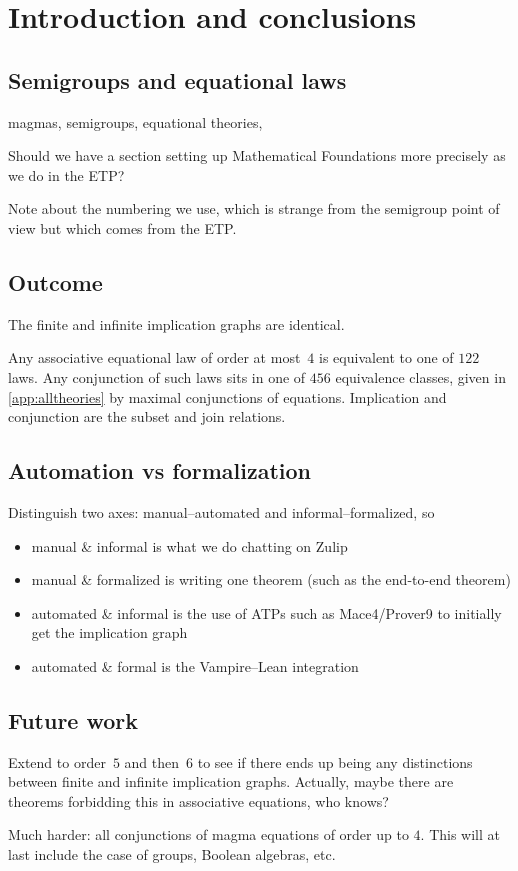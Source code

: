 \section{Introduction and conclusions}

\subsection{Semigroups and equational laws}


magmas, semigroups, equational theories,

Should we have a section setting up Mathematical Foundations more precisely as we do in the ETP?

Note about the numbering we use, which is strange from the semigroup point of view but which comes from the ETP.

\subsection{Outcome}

The finite and infinite implication graphs are identical.

\begin{theorem}
  Any associative equational law of order at most~$4$ is equivalent to one of $122$ laws.
  Any conjunction of such laws sits in one of $456$ equivalence classes, given in \autoref{app:alltheories} by maximal conjunctions of equations.
  Implication and conjunction are the subset and join relations.
\end{theorem}

\subsection{Automation vs formalization}

Distinguish two axes: manual--automated and informal--formalized, so
\begin{itemize}
\item manual \& informal is what we do chatting on Zulip
\item manual \& formalized is writing one theorem (such as the end-to-end theorem)
\item automated \& informal is the use of ATPs such as Mace4/Prover9 to initially get the implication graph
\item automated \& formal is the Vampire--Lean integration
\end{itemize}

\subsection{Future work}

Extend to order~$5$ and then~$6$ to see if there ends up being any distinctions between finite and infinite implication graphs.
Actually, maybe there are theorems forbidding this in associative equations, who knows?

Much harder: all conjunctions of magma equations of order up to $4$.  This will at last include the case of groups, Boolean algebras, etc.
